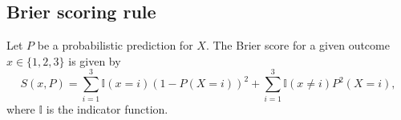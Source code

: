 \documentclass[journal,article,accept,moreauthors,pdftex,12pt,a4paper]{mdpi}
\begin{document}
	
	
	
	\subsection{Brier scoring rule}
	
	Let $P$ be a probabilistic prediction  for $X$.
	The Brier score for a given outcome $x\in\{1,2,3\}$ is given by
	$$S(x,P)= \sum_{i=1}^3\mathbb{I}(x=i)(1- P(X=i))^2+\sum_{i=1}^3\mathbb{I}(x\neq i)P^2(X=i),$$
	where $\mathbb{I}$ is the indicator function.
	
\end{document}
